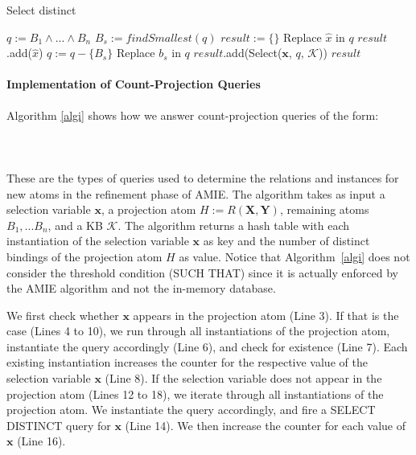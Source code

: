 \begin{algorithm}
\caption{Select distinct}
\label{select}
\begin{algorithmic}[1]
    \State $q := B_1 \wedge ... \wedge B_n$
    \State $B_s := findSmallest(q)$
    \State $result := \lbrace \rbrace$
	\State Replace $\hat{x}$ in $q$
	  \State $result$.add($\hat{x}$)
	\EndIf
      \EndFor
    \Else
      \State $q := q - \{ B_s\}$
      	\State Replace $b_s$ in $q$
      	\State $result$.add(Select($\bm{x}$, $q$, $\mathcal{K}$))
      \EndFor
    \EndIf
    \State \Return $result$
\EndFunction
\end{algorithmic}
\end{algorithm}

\paragraph{Implementation of Count-Projection Queries} Algorithm \ref{algi} shows how we answer count-projection queries
of the form: \\ \\
 \\ \\
These are the types of queries used to determine the relations and instances for new atoms in the refinement
phase of AMIE. The algorithm takes as input a selection variable $\bm{x}$, a projection atom $H:=R(\bm{X},\bm{Y})$, remaining atoms $B_1, ... B_n$, 
and a KB $\mathcal{K}$. 
The algorithm returns a hash table with each instantiation of the selection variable 
$\bm{x}$ as key and the number of distinct bindings of the projection atom $H$ as value. Notice that Algorithm~\ref{algi}
does not consider the threshold condition (SUCH THAT) since it is actually enforced by the AMIE algorithm and not 
the in-memory database. 

We first check whether $\bm{x}$ appears in the projection atom (Line 3).
If that is the case (Lines 4 to 10), we run through all instantiations of the projection atom, instantiate the query accordingly (Line 6), and check for existence (Line 7).
Each existing instantiation increases the counter for the respective value of the selection variable $\bm{x}$ (Line 8). 
If the selection variable does not appear in the projection atom (Lines 12 to 18), 
we iterate through all instantiations of the projection atom.
We instantiate the query accordingly, and fire a SELECT DISTINCT query for $\bm{x}$ (Line 14). 
We then increase the counter for each value of $\bm{x}$ (Line 16).

